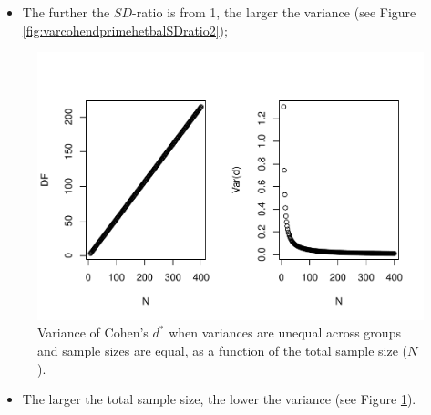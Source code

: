 \documentclass[
  english,
  man,mask]{apa6}
\providecommand{\tightlist}{%
  \setlength{\itemsep}{0pt}\setlength{\parskip}{0pt}}
\begin{document}
\begin{itemize}
\tightlist
\item
  The further the \(SD\)-ratio is from 1, the larger the variance (see Figure \ref{fig:varcohendprimehetbalSDratio2});
\end{itemize}

\begin{figure}
\centering
\includegraphics{Theoretical-Bias-of-all-estimators-as-a-function-of-population-parameters_files/figure-latex/varcohendprimehetbalNsize2-1.pdf}
\caption{\label{fig:varcohendprimehetbalNsize2}Variance of Cohen's \(d^*\) when variances are unequal across groups and sample sizes are equal, as a function of the total sample size (\(N\)).}
\end{figure}

\begin{itemize}
\tightlist
\item
  The larger the total sample size, the lower the variance (see Figure \ref{fig:varcohendprimehetbalNsize2}).
\end{itemize}
\end{document}
